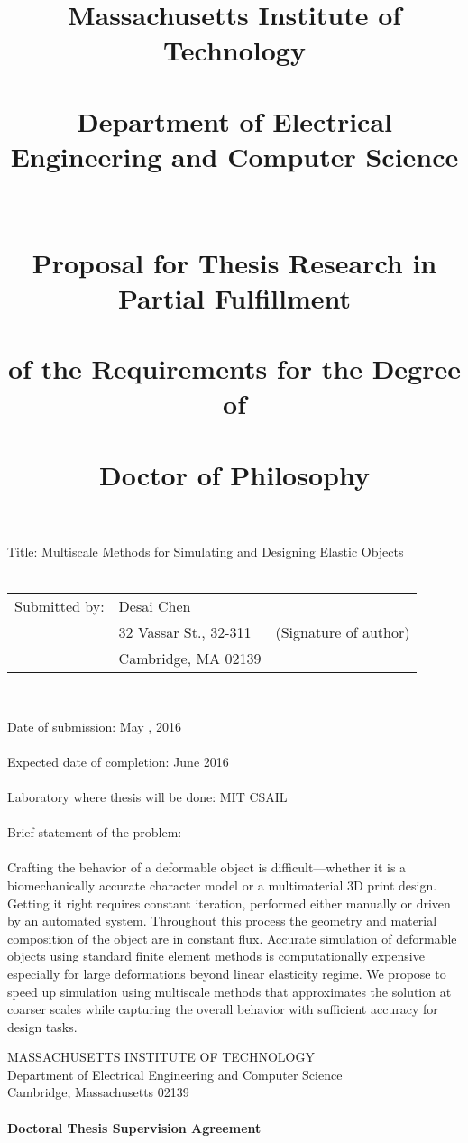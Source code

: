\documentclass[11pt]{article}
\title{ \large{Massachusetts Institute of Technology\\~\\
	Department of Electrical Engineering and Computer Science\\~\\~\\
	Proposal for Thesis Research in Partial Fulfillment\\~\\
	of the Requirements for the Degree of\\~\\
	Doctor of Philosophy }}
\date{}
\begin{document}
	\maketitle
\begin{flushleft}
 Title: Multiscale Methods for Simulating and Designing Elastic Objects\\~\\
\end{flushleft} 
\hskip-0.2cm\begin{tabular}{p{4cm} p{6cm} p{8cm}}
 	 Submitted by: & Desai Chen & \underline{\hspace{6cm}}\\
                   &32 Vassar St., 32-311 & (Signature of author) 	  \\
                   &Cambridge, MA 02139&
\end{tabular}\\
\begin{flushleft}
Date of submission: May , 2016\\~\\
Expected date of completion: June 2016\\~\\
Laboratory where thesis will be done: MIT CSAIL\\~\\
Brief statement of the problem:\\~\\
Crafting the behavior of a deformable object is difficult---whether it is a biomechanically accurate character model or a multimaterial 3D print design.
Getting it right requires constant iteration, performed either manually or driven by an automated system.
Throughout this process the geometry and material composition of the object are in constant flux.
Accurate simulation of deformable objects using standard finite element methods is computationally expensive especially for large deformations beyond linear elasticity regime.
We propose to speed up simulation using multiscale methods that approximates the solution at coarser scales while capturing the overall behavior with sufficient accuracy for design tasks.
\end{flushleft}
\newpage
\begin{center}
	MASSACHUSETTS INSTITUTE OF TECHNOLOGY\\
	Department of Electrical Engineering and Computer Science\\
	Cambridge, Massachusetts 02139\\~\\
	\textbf{Doctoral Thesis Supervision Agreement}\\~\\
\end{center}
\end{document}
